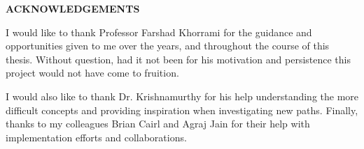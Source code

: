 \clearpage
\vspace*{\fill}
	\begin{center}
		\begin{minipage}{\textwidth}
			{\begin{center}{\textbf{ACKNOWLEDGEMENTS}}\end{center}\vspace{10mm}}
			I would like to thank Professor Farshad Khorrami for the guidance
            and opportunities given to me over the years, and throughout the 
            course of this thesis.
            Without question, had it not been for his motivation and persistence
            this project would not have come to fruition.
			
			\vspace{5mm}
			\hspace{5mm} 
			I would also like to thank Dr. Krishnamurthy for his help
            understanding the more difficult concepts and providing inspiration
            when investigating new paths. Finally, thanks to my colleagues
            Brian Cairl and Agraj Jain for their help with implementation
            efforts and collaborations.
		\end{minipage}
	\end{center}
\vfill %
\clearpage
